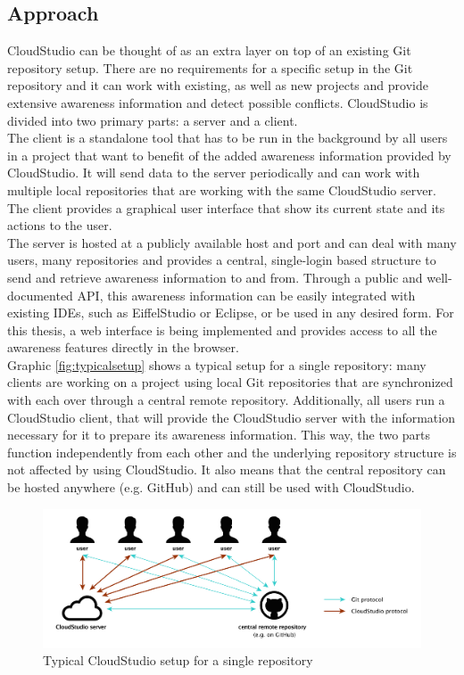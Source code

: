 \subsection{Approach}\label{designapproach}


CloudStudio can be thought of as an extra layer on top of an existing Git repository setup. There are no requirements for a specific setup in the Git repository and it can work with existing, as well as new projects and provide extensive awareness information and detect possible conflicts. CloudStudio is divided into two primary parts: a server and a client. \\

The client is a standalone tool that has to be run in the background by all users in a project that want to benefit of the added awareness information provided by CloudStudio. It will send data to the server periodically and can work with multiple local repositories that are working with the same CloudStudio server. The client provides a graphical user interface that show its current state and its actions to the user. \\

The server is hosted at a publicly available host and port and can deal with many users, many repositories and provides a central, single-login based structure to send and retrieve awareness information to and from. Through a public and well-documented API, this awareness information can be easily integrated with existing IDEs, such as EiffelStudio \cite{eiffelstudio} or Eclipse, or be used in any desired form. For this thesis, a web interface is being implemented and provides access to all the awareness features directly in the browser. \\

Graphic \ref{fig:typicalsetup} shows a typical setup for a single repository: many clients are working on a project using local Git repositories that are synchronized with each over through a central remote repository. Additionally, all users run a CloudStudio client, that will provide the CloudStudio server with the information necessary for it to prepare its awareness information. This way, the two parts function independently from each other and the underlying repository structure is not affected by using CloudStudio. It also means that the central repository can be hosted anywhere (e.g. GitHub) and can still be used with CloudStudio. \\

\begin{figure}[h!]
  \centering
      \includegraphics[width=1\textwidth]{generalsetup}
  \caption{Typical CloudStudio setup for a single repository}
  \label{fig:generalsetup}
\end{figure}

